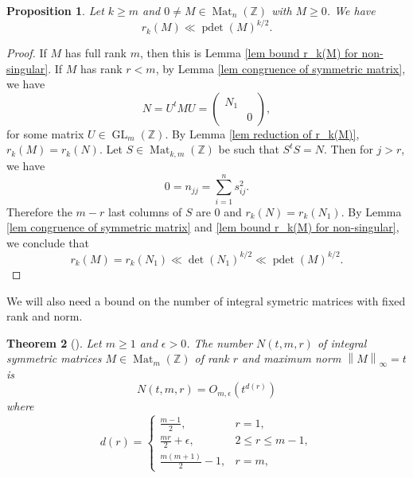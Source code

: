 \documentclass[oneside]{amsart}
\numberwithin{equation}{section}
\newtheorem{theorem}{Theorem}[section]
\newtheorem{proposition}[theorem]{Proposition}
\theoremstyle{definition}
\theoremstyle{remark}
\theoremstyle{remark}
\newcommand{\ZZ}{\mathbb Z}
\newcommand{\norm}[1]{\left\lVert #1\right\rVert}		%
\DeclareMathOperator{\Mat}{Mat}
\DeclareMathOperator{\GL}{GL}
\DeclareMathOperator{\pdet}{pdet}
\newcommand{\pmatrixtwo}[4]{\begin{pmatrix}#1&#2\\#3&#4\end{pmatrix}}
\begin{document}
\begin{proposition}\label{pro bound r_k(M)}
Let $k\geq m$ and $0\neq M\in\Mat_n(\ZZ)$ with $M\geq0$. We have
$$r_k(M)\ll\pdet(M)^{k/2}.$$
\end{proposition}

\begin{proof}
If $M$ has full rank $m$, then this is Lemma \ref{lem bound r_k(M) for non-singular}. If $M$ has rank $r<m$, by Lemma \ref{lem congruence of symmetric matrix}, we have
$$N=U^tMU=\pmatrixtwo{N_1}{}{}0,$$
for some matrix $U\in\GL_m(\ZZ)$. By Lemma \ref{lem reduction of r_k(M)}, $r_k(M)=r_k(N)$. Let $S\in\Mat_{k,m}(\ZZ)$ be such that $S^tS=N$. Then for $j>r$, we have
$$0=n_{jj}=\sum_{i=1}^ns_{ij}^2.$$
Therefore the $m-r$ last columns of $S$ are 0 and $r_k(N)=r_k(N_1)$. By Lemma \ref{lem congruence of symmetric matrix} and \ref{lem bound r_k(M) for non-singular}, we conclude that
$$r_k(M)=r_k(N_1)\ll\det(N_1)^{k/2}\ll\pdet(M)^{k/2}.$$
\end{proof}

We will also need a bound on the number of integral symetric matrices with fixed rank and norm.
\begin{theorem}[\cite{EK95,Sch95a}]\label{thm number of symmetric matrices}
Let $m\geq1$ and $\epsilon>0$. The number $N(t,m,r)$ of integral symmetric matrices $M\in\Mat_m(\ZZ)$ of rank $r$ and maximum norm $\norm M_\infty=t$ is
$$N(t,m,r)=O_{m,\epsilon}\left(t^{d(r)}\right)$$
where
$$d(r)=\begin{cases}\frac{m-1}2, &r=1,\\\frac{mr}2+\epsilon,&2\leq r\leq m-1,\\\frac{m(m+1)}2-1,&r=m,\end{cases}$$
\end{theorem}
\end{document}
